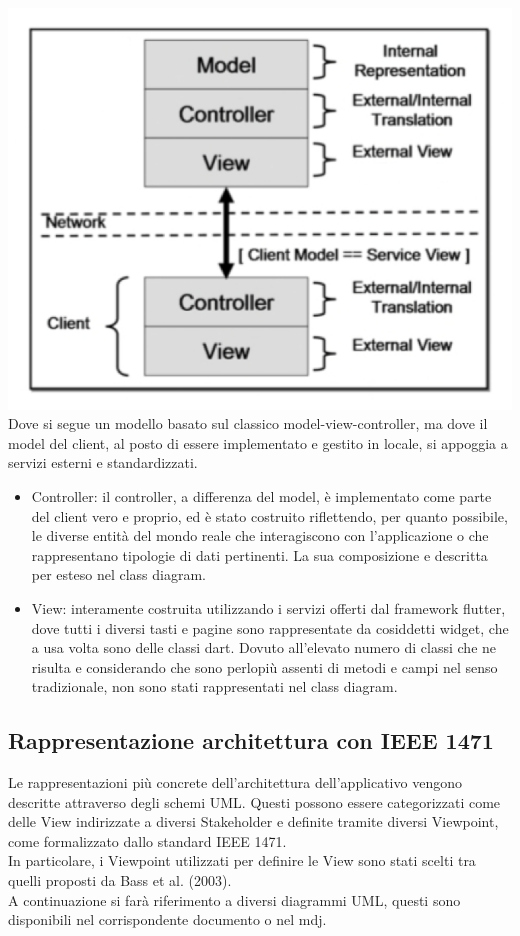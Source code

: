 \documentclass{article}
\begin{document}
\\\includegraphics[scale = 0.45]{"Immagini/controllerViewArch.png"}
\\Dove si segue un modello basato sul classico model-view-controller, ma dove il model del client, al posto di essere implementato e gestito in locale, si appoggia a servizi esterni e standardizzati. 
\begin{itemize}
    \item Controller: il controller, a differenza del model, è implementato come parte del client vero e proprio, ed è stato costruito riflettendo, per quanto possibile, le diverse entità del mondo reale che interagiscono con l’applicazione o che rappresentano tipologie di dati pertinenti. La sua composizione e descritta per esteso nel class diagram.
    \item View: interamente costruita utilizzando i servizi offerti dal framework flutter, dove tutti i diversi tasti e pagine sono rappresentate da cosiddetti widget, che a usa volta sono delle classi dart. Dovuto all’elevato numero di classi che ne risulta e considerando che sono perlopiù assenti di metodi e campi nel senso tradizionale, non sono stati rappresentati nel class diagram. 
    \end{itemize}
\subsection{Rappresentazione architettura con IEEE 1471} 
Le rappresentazioni più concrete dell'architettura dell'applicativo vengono descritte attraverso degli schemi UML. Questi possono essere categorizzati come delle View indirizzate a diversi Stakeholder e definite tramite diversi Viewpoint, come formalizzato dallo standard IEEE 1471. 
\\In particolare, i Viewpoint utilizzati per definire le View sono stati scelti tra quelli proposti da Bass et al. (2003).
\\A continuazione si farà riferimento a diversi diagrammi UML, questi sono disponibili nel corrispondente documento o nel mdj.
\end{document}
